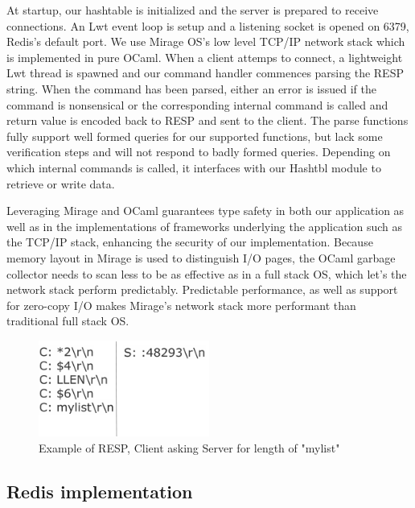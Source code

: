 \documentclass[english,10pt,twocolumn]{article}
\begin{document}
At startup, our hashtable is initialized and the server is prepared to receive connections. An Lwt event loop is setup and a listening socket is opened on 6379, Redis's default port.
We use Mirage OS's low level TCP/IP network stack which is implemented in pure OCaml.
When a client attemps to connect, a lightweight Lwt thread is spawned and our command handler commences parsing the RESP string.
When the command has been parsed, either an error is issued if the command is nonsensical or the corresponding internal command is called and return value is encoded back to RESP and sent to the client.
The parse functions fully support well formed queries for our supported functions, but lack some verification steps and will not respond to badly formed queries.
Depending on which internal commands is called, it interfaces with our Hashtbl module to retrieve or write data.

Leveraging Mirage and OCaml guarantees type safety in both our application as well as in the implementations of frameworks underlying the application such as the TCP/IP stack, enhancing the security of our implementation.
Because memory layout in Mirage is used to distinguish I/O pages, the OCaml garbage collector needs to scan less to be as effective as in a full stack OS, which let's the network stack perform predictably.
Predictable performance, as well as support for zero-copy I/O makes Mirage's network stack more performant than traditional full stack OS.

\begin{figure}[ht]
  \centering
  \caption{Example of RESP, Client asking Server for length of "mylist"}
  \includegraphics[width=0.5\textwidth]{images/resp}
\end{figure}


\subsection{Redis implementation}
\end{document}
